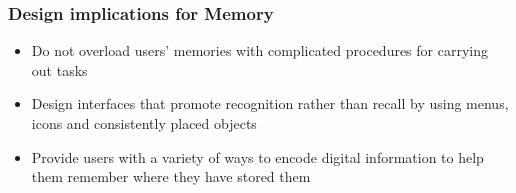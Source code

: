 \documentclass{article}[18pt]
\begin{document}
\subsubsection{Design implications for Memory}
\begin{itemize}
	\item Do not overload users' memories with complicated procedures for carrying out tasks
	\item Design interfaces that promote recognition rather than recall by using menus, icons and consistently placed objects
	\item Provide users with a variety of ways to encode digital information to help them remember where they have stored them
\end{itemize}
\end{document}
